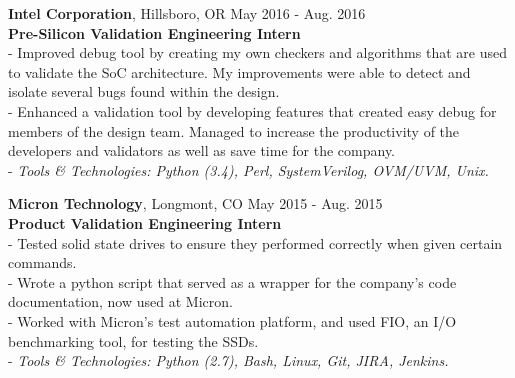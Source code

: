 \documentclass[12pt]{article}
\newcommand\ttab[1][1cm]{\hspace*{#1}}
\begin{document}
\begin{flushleft}
\textbf{Intel Corporation}, Hillsboro, OR \hfill May 2016 - Aug. 2016\\
\textbf{Pre-Silicon Validation Engineering Intern}\\
{\footnotesize
\ttab- Improved debug tool by creating my own checkers and algorithms that are used to validate the SoC architecture. My \ttab improvements were able to detect and isolate several bugs found within the design.\\
\ttab- Enhanced a validation tool by developing features that created easy debug for members of the design team. Managed to \ttab increase the productivity of the developers and validators as well as save time for the company. \\
\ttab- \textit{Tools \& Technologies: Python (3.4), Perl, SystemVerilog, OVM/UVM, Unix.}\\[3mm]
}

\textbf{Micron Technology}, Longmont, CO \hfill May 2015 - Aug. 2015\\
\textbf{Product Validation Engineering Intern}\\
{\footnotesize
\ttab- Tested solid state drives to ensure they performed correctly when given certain commands.\\
\ttab- Wrote a python script that served as a wrapper for the company's code documentation, now used at Micron.\\
\ttab- Worked with Micron's test automation platform, and used FIO, an I/O benchmarking tool, for testing the SSDs.\\
\ttab- \textit{Tools \& Technologies: Python (2.7), Bash, Linux, Git, JIRA, Jenkins.}\\[3mm]
}



\end{flushleft}
\end{document}
